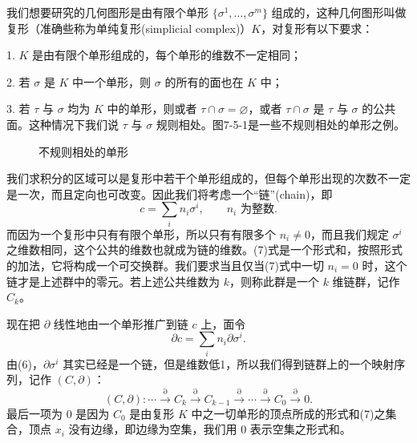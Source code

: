 我们想要研究的几何图形是由有限个单形 $\{\sigma^1,\ldots,\sigma^m\}$ 组成的，这种几何图形叫做复形（准确些称为单纯复形(simplicial complex)）$K$，对复形有以下要求：

1. $K$ 是由有限个单形组成的，每个单形的维数不一定相同；

2. 若 $\sigma$ 是 $K$ 中一个单形，则 $\sigma$ 的所有的面也在 $K$ 中；

3. 若 $\tau$ 与 $\sigma$ 均为 $K$ 中的单形，则或者 $\tau\cap\sigma=\varnothing$，或者 $\tau\cap\sigma$ 是 $\tau$ 与 $\sigma$ 的公共面。这种情况下我们说 $\tau$ 与 $\sigma$ 规则相处。图7-5-1是一些不规则相处的单形之例。

\begin{figure}[htbp]
\centering
{}
\caption{不规则相处的单形}
\end{figure}

我们求积分的区域可以是复形中若干个单形组成的，但每个单形出现的次数不一定是一次，而且定向也可改变。因此我们将考虑一个“链”(chain)，即
\begin{equation}
 c=\sum_i n_i\sigma^i,\qquad n_i\text{ 为整数}.
 \tag{7}
\end{equation}
而因为一个复形中只有有限个单形，所以只有有限多个 $n_i\ne0$，而且我们规定 $\sigma^i$ 之维数相同，这个公共的维数也就成为链的维数。(7)式是一个形式和，按照形式的加法，它将构成一个可交换群。我们要求当且仅当(7)式中一切 $n_i=0$ 时，这个链才是上述群中的零元。若上述公共维数为 $k$，则称此群是一个 $k$ 维链群，记作 $C_k$。

现在把 $\partial$ 线性地由一个单形推广到链 $c$ 上，面令
\[
 \partial c=\sum_i n_i\partial\sigma^i.
\]
由(6)，$\partial\sigma^i$ 其实已经是一个链，但是维数低1，所以我们得到链群上的一个映射序列，记作 $(C,\partial)$：
\begin{equation}
 (C,\partial):\cdots\xrightarrow{\partial}C_k\xrightarrow{\partial}C_{k-1}
 \xrightarrow{\partial}\cdots\xrightarrow{\partial}C_0\xrightarrow{\partial}0.
 \tag{8}
\end{equation}
最后一项为 $0$ 是因为 $C_0$ 是由复形 $K$ 中之一切单形的顶点所成的形式和(7)之集合，顶点 $x_i$ 没有边缘，即边缘为空集，我们用 $0$ 表示空集之形式和。

